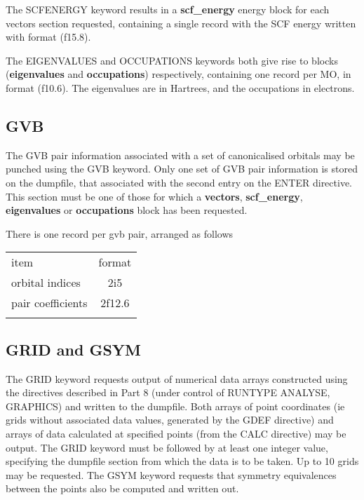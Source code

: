 \documentclass[11pt,fleqn]{article}
\begin{document}
The SCFENERGY keyword results in a {\bf scf\_energy} energy block for each vectors section 
requested, containing a single record with the SCF energy written with format (f15.8). 

The EIGENVALUES and OCCUPATIONS keywords both give rise to blocks ({\bf eigenvalues} and 
{\bf occupations}) respectively, containing one record per MO, in format (f10.6). The eigenvalues
are in Hartrees, and the occupations in electrons.

\subsection[GVB]{GVB}

The GVB pair information associated with a set of canonicalised orbitals
may be punched using the GVB keyword. Only one set of GVB pair
information is stored on the dumpfile, that associated with the
second entry on the ENTER directive. This section must be one
of those for which a {\bf vectors}, {\bf scf\_energy}, {\bf eigenvalues} or 
{\bf occupations} block has been requested.

There is one record per gvb pair, arranged as follows

 \begin{centering}
 \begin{tabular}{lc}
\\ \hline
  item         & format\\ \cline{1-2}
orbital indices   &  2i5 \\
pair coefficients &  2f12.6 \\
\hline
\\
 \end{tabular}

 \end{centering}

\subsection[GRID and GSYM]{GRID and GSYM}
The GRID keyword requests output of numerical data arrays constructed using the directives described in 
Part 8 (under control of RUNTYPE ANALYSE, GRAPHICS) and written to the dumpfile.
Both arrays of point coordinates (ie grids without associated data values, generated
by the GDEF directive)  and
arrays of data calculated at specified points (from the CALC directive) may be output.
The GRID keyword must be 
followed by at least one integer value, specifying the dumpfile section 
from which the data is to be taken. Up to 10 grids may be requested.
The GSYM keyword requests that symmetry equivalences between the points also
be computed and written out.
\end{document}
